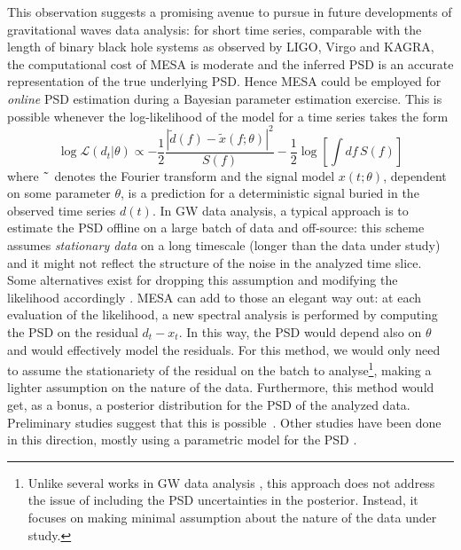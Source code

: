 \documentclass{aa}
\newcommand{\todo}[1]{{\textcolor{red}{\texttt{TODO: #1}} }}
\begin{document}
This observation suggests a promising avenue to pursue in future developments of gravitational waves data analysis: for short time series, comparable with the length of binary black hole systems as observed by LIGO, Virgo and KAGRA, the computational cost of MESA is moderate and the inferred PSD is an accurate representation of the true underlying PSD. Hence MESA could be employed for {\it online} PSD estimation during a Bayesian parameter estimation exercise.
This is possible whenever the log-likelihood of the model for a time series takes the form
\begin{equation}
	\log\mathcal{L}(d_t | \theta) \propto  -\frac{1}{2} \frac{|\tilde{d}(f)- \tilde{x}(f;\theta)|^2}{S(f)} - \frac{1}{2}\log\left[\int  df\,S(f)\right]
\end{equation}
where $\tilde{\hphantom{a}}$ denotes the Fourier transform and the signal model $x(t;\theta)$, dependent on some parameter $\theta$, is a prediction for a deterministic signal buried in the observed time series $d(t)$.
In GW data analysis, a typical approach is to estimate the PSD offline on a large batch of data and off-source: this scheme assumes {\it stationary data} on a long timescale (longer than the data under study) and it might not reflect the structure of the noise in the analyzed time slice.
Some alternatives exist for dropping this assumption and modifying the likelihood accordingly \citep{R_ver_2010, R_ver_2011, Edwards_2020, Chatziioannou_2021}.
MESA can add to those an elegant way out: at each evaluation of the likelihood, a new spectral analysis is performed by computing the PSD on the residual $d_t-x_t$.
In this way, the PSD would depend also on $\theta$ and would effectively model the residuals. For this method, we would only need to assume the stationariety of the residual on the batch to analyse\footnote{
Unlike several works in GW data analysis \citep{Biscoveanu_2020, talbot2020gravitationalwave}, this approach does not address the issue of including the PSD uncertainties in the posterior. Instead, it focuses on making minimal assumption about the nature of the data under study.
}, making a lighter assumption on the nature of the data. Furthermore, this method would get, as a bonus, a posterior distribution for the PSD of the analyzed data.
Preliminary studies suggest that this is possible~\citep{martini_thesis}. Other studies have been done in this direction, mostly using a parametric model for the PSD \citep{Littenberg_2013, Edwards_2015, lalinference}.
\end{document}
